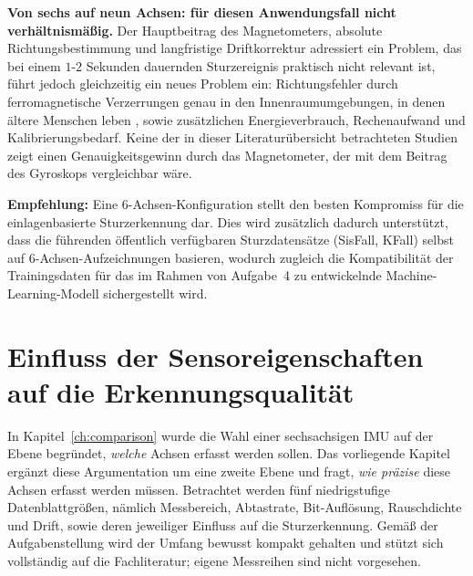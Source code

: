 \documentclass[11pt,a4paper,oneside]{report}
\begin{document}
\textbf{Von sechs auf neun Achsen: für diesen Anwendungsfall nicht
verhältnismäßig.} Der Hauptbeitrag des Magnetometers, absolute
Richtungsbestimmung und langfristige Driftkorrektur
\cite{roetenberg2005} adressiert ein Problem, das bei einem
$1$-$2$ Sekunden dauernden Sturzereignis praktisch nicht relevant ist,
führt jedoch gleichzeitig ein neues Problem ein: Richtungsfehler durch
ferromagnetische Verzerrungen genau in den Innenraumumgebungen, in denen
ältere Menschen leben
\cite{pmc11991382,yang2024neurit,pubmed25347584}, sowie zusätzlichen
Energieverbrauch, Rechenaufwand und Kalibrierungsbedarf. Keine der in dieser
Literaturübersicht betrachteten Studien zeigt einen Genauigkeitsgewinn durch
das Magnetometer, der mit dem Beitrag des Gyroskops vergleichbar wäre.

\textbf{Empfehlung:} Eine 6-Achsen-Konfiguration stellt den besten Kompromiss
für die einlagenbasierte Sturzerkennung dar. Dies wird zusätzlich dadurch
unterstützt, dass die führenden öffentlich verfügbaren Sturzdatensätze
(SisFall, KFall) selbst auf 6-Achsen-Aufzeichnungen basieren, wodurch zugleich
die Kompatibilität der Trainingsdaten für das im Rahmen von Aufgabe~4 zu
entwickelnde Machine-Learning-Modell sichergestellt wird.


\chapter{Einfluss der Sensoreigenschaften auf die Erkennungsqualität}
\label{ch:properties}

In Kapitel~\ref{ch:comparison} wurde die Wahl einer sechsachsigen \ac{IMU} auf
der Ebene begründet, \emph{welche} Achsen erfasst werden sollen. Das
vorliegende Kapitel ergänzt diese Argumentation um eine zweite Ebene und
fragt, \emph{wie präzise} diese Achsen erfasst werden müssen. Betrachtet
werden fünf niedrigstufige Datenblattgrößen, nämlich Messbereich,
Abtastrate, Bit-Auflösung, Rauschdichte und Drift, sowie deren jeweiliger
Einfluss auf die Sturzerkennung. Gemäß der Aufgabenstellung wird der
Umfang bewusst kompakt gehalten und stützt sich vollständig auf die
Fachliteratur; eigene Messreihen sind nicht vorgesehen.
\end{document}

